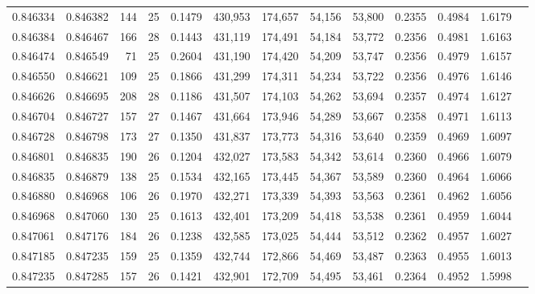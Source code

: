 \begin{tabular}{rrrrrrrrrrrrr}
0.846334 & 0.846382 &   144 &  25 &                                     0.1479 & 430,953 & 174,657 &  54,156 &  53,800 & 0.2355 & 0.4984 & 1.6179 \\
0.846384 & 0.846467 &   166 &  28 &                                     0.1443 & 431,119 & 174,491 &  54,184 &  53,772 & 0.2356 & 0.4981 & 1.6163 \\
0.846474 & 0.846549 &    71 &  25 &                                     0.2604 & 431,190 & 174,420 &  54,209 &  53,747 & 0.2356 & 0.4979 & 1.6157 \\
0.846550 & 0.846621 &   109 &  25 &                                     0.1866 & 431,299 & 174,311 &  54,234 &  53,722 & 0.2356 & 0.4976 & 1.6146 \\
0.846626 & 0.846695 &   208 &  28 &                                     0.1186 & 431,507 & 174,103 &  54,262 &  53,694 & 0.2357 & 0.4974 & 1.6127 \\
0.846704 & 0.846727 &   157 &  27 &                                     0.1467 & 431,664 & 173,946 &  54,289 &  53,667 & 0.2358 & 0.4971 & 1.6113 \\
0.846728 & 0.846798 &   173 &  27 &                                     0.1350 & 431,837 & 173,773 &  54,316 &  53,640 & 0.2359 & 0.4969 & 1.6097 \\
0.846801 & 0.846835 &   190 &  26 &                                     0.1204 & 432,027 & 173,583 &  54,342 &  53,614 & 0.2360 & 0.4966 & 1.6079 \\
0.846835 & 0.846879 &   138 &  25 &                                     0.1534 & 432,165 & 173,445 &  54,367 &  53,589 & 0.2360 & 0.4964 & 1.6066 \\
0.846880 & 0.846968 &   106 &  26 &                                     0.1970 & 432,271 & 173,339 &  54,393 &  53,563 & 0.2361 & 0.4962 & 1.6056 \\
0.846968 & 0.847060 &   130 &  25 &                                     0.1613 & 432,401 & 173,209 &  54,418 &  53,538 & 0.2361 & 0.4959 & 1.6044 \\
0.847061 & 0.847176 &   184 &  26 &                                     0.1238 & 432,585 & 173,025 &  54,444 &  53,512 & 0.2362 & 0.4957 & 1.6027 \\
0.847185 & 0.847235 &   159 &  25 &                                     0.1359 & 432,744 & 172,866 &  54,469 &  53,487 & 0.2363 & 0.4955 & 1.6013 \\
0.847235 & 0.847285 &   157 &  26 &                                     0.1421 & 432,901 & 172,709 &  54,495 &  53,461 & 0.2364 & 0.4952 & 1.5998 \\

\end{tabular}
